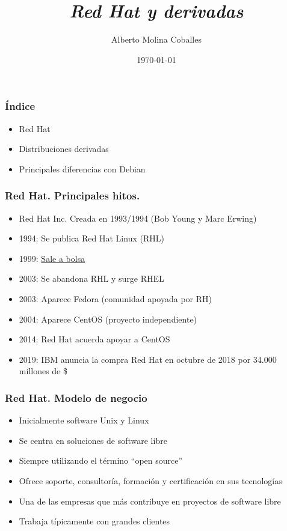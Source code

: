 \documentclass{beamer}
\author{Alberto Molina Coballes}
\title{\emph{Red Hat y derivadas}}
\institute{IES Gonzalo Nazareno}
\date{\today}
\begin{document}
\def\braces#1{[#1]}

\begin{frame}[t,plain]
\titlepage
\end{frame}

\begin{frame}
  \frametitle{Índice}
  \begin{itemize}
  \item Red Hat
  \item Distribuciones derivadas
  \item Principales diferencias con Debian
  \end{itemize}
\end{frame}

\begin{frame}
  \frametitle{Red Hat. Principales hitos.}
  \begin{itemize}
  \item Red Hat Inc. Creada en 1993/1994 (Bob Young y Marc Erwing)
  \item 1994: Se publica Red Hat Linux (RHL)
  \item 1999: \href{https://es.finance.yahoo.com/echarts?s=RHT}{Sale a bolsa}
  \item 2003: Se abandona RHL y surge RHEL
  \item 2003: Aparece Fedora (comunidad apoyada por RH)
  \item 2004: Aparece CentOS (proyecto independiente)
  \item 2014: Red Hat acuerda apoyar a CentOS
  \item 2019: IBM anuncia la compra Red Hat en octubre de 2018 por 34.000 millones de \$
  \end{itemize}
\end{frame}

\begin{frame}
  \frametitle{Red Hat. Modelo de negocio}
  \begin{itemize}
  \item Inicialmente software Unix y Linux
  \item Se centra en soluciones de software libre
  \item Siempre utilizando el término ``open source''
  \item Ofrece soporte, consultoría, formación y certificación en sus tecnologías
  \item Una de las empresas que más contribuye en proyectos de software libre
  \item Trabaja típicamente con grandes clientes
  \end{itemize}
\end{frame}
\end{document}
